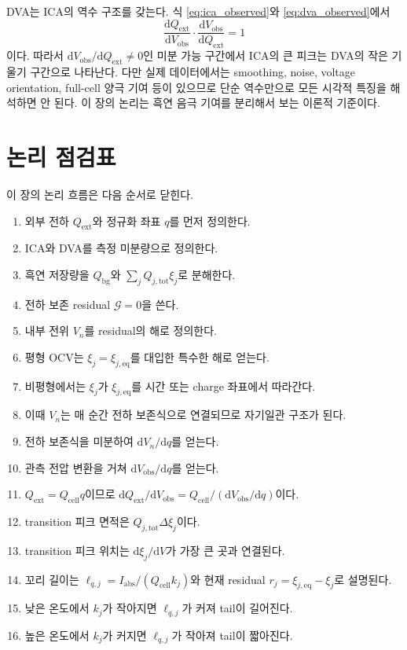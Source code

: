 \documentclass[11pt,a4paper]{article}
\newcommand{\dd}{\mathrm{d}}
\newcommand{\ext}{\mathrm{ext}}
\newcommand{\cell}{\mathrm{cell}}
\newcommand{\bg}{\mathrm{bg}}
\newcommand{\tot}{\mathrm{tot}}
\newcommand{\eqs}{\mathrm{eq}}
\newcommand{\obs}{\mathrm{obs}}
\newcommand{\absI}{I_{\mathrm{abs}}}
\begin{document}
DVA는 ICA의 역수 구조를 갖는다. 식 \eqref{eq:ica_observed}와 \eqref{eq:dva_observed}에서
\begin{equation}
\frac{\dd Q_{\ext}}{\dd V_{\obs}}
\cdot
\frac{\dd V_{\obs}}{\dd Q_{\ext}}
=1
\label{eq:ica_dva_reciprocal}
\end{equation}
이다. 따라서 \(\dd V_{\obs}/\dd Q_{\ext}\neq 0\)인 미분 가능 구간에서 ICA의 큰 피크는 DVA의 작은 기울기 구간으로 나타난다. 다만 실제 데이터에서는 smoothing, noise, voltage orientation, full-cell 양극 기여 등이 있으므로 단순 역수만으로 모든 시각적 특징을 해석하면 안 된다. 이 장의 논리는 흑연 음극 기여를 분리해서 보는 이론적 기준이다.

\section{논리 점검표}

이 장의 논리 흐름은 다음 순서로 닫힌다.

\begin{enumerate}
\item 외부 전하 \(Q_{\ext}\)와 정규화 좌표 \(q\)를 먼저 정의한다.
\item ICA와 DVA를 측정 미분량으로 정의한다.
\item 흑연 저장량을 \(Q_{\bg}\)와 \(\sum_jQ_{j,\tot}\xi_j\)로 분해한다.
\item 전하 보존 residual \(\mathcal{G}=0\)을 쓴다.
\item 내부 전위 \(V_n\)를 residual의 해로 정의한다.
\item 평형 OCV는 \(\xi_j=\xi_{j,\eqs}\)를 대입한 특수한 해로 얻는다.
\item 비평형에서는 \(\xi_j\)가 \(\xi_{j,\eqs}\)를 시간 또는 charge 좌표에서 따라간다.
\item 이때 \(V_n\)는 매 순간 전하 보존식으로 연결되므로 자기일관 구조가 된다.
\item 전하 보존식을 미분하여 \(\dd V_n/\dd q\)를 얻는다.
\item 관측 전압 변환을 거쳐 \(\dd V_{\obs}/\dd q\)를 얻는다.
\item \(Q_{\ext}=Q_{\cell}q\)이므로 \(\dd Q_{\ext}/\dd V_{\obs}=Q_{\cell}/(\dd V_{\obs}/\dd q)\)이다.
\item transition 피크 면적은 \(Q_{j,\tot}\Delta\xi_j\)이다.
\item transition 피크 위치는 \(\dd\xi_j/\dd V\)가 가장 큰 곳과 연결된다.
\item 꼬리 길이는 \(\ell_{q,j}=\absI/(Q_{\cell}k_j)\)와 현재 residual \(r_j=\xi_{j,\eqs}-\xi_j\)로 설명된다.
\item 낮은 온도에서 \(k_j\)가 작아지면 \(\ell_{q,j}\)가 커져 tail이 길어진다.
\item 높은 온도에서 \(k_j\)가 커지면 \(\ell_{q,j}\)가 작아져 tail이 짧아진다.
\end{enumerate}
\end{document}
